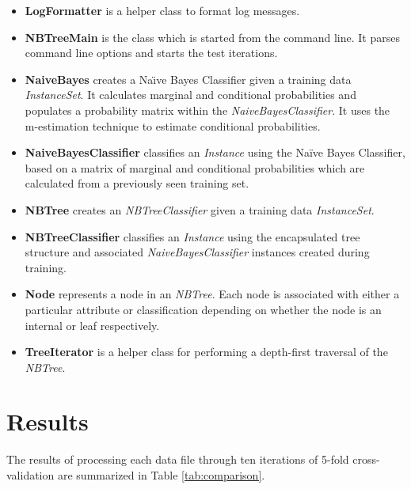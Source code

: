 \documentclass[10pt]{report}
\begin{document}
\begin{itemize}
\item \textbf{LogFormatter} is a helper class to format log messages.

\item \textbf{NBTreeMain} is the class which is started from the command
  line. It parses command line options and starts the test iterations.

\item \textbf{NaiveBayes} creates a Na\"{\i}ve Bayes Classifier
  given a training data \textit{InstanceSet}. It calculates marginal
  and conditional probabilities and populates a probability matrix
  within the \textit{NaiveBayesClassifier}. It uses the m-estimation
  technique to estimate conditional probabilities.

\item \textbf{NaiveBayesClassifier} classifies an \textit{Instance}
  using the Na\"{i}ve Bayes Classifier, based on a matrix of
  marginal and conditional probabilities which are calculated from a
  previously seen training set.

\item \textbf{NBTree} creates an \textit{NBTreeClassifier} given a
  training data \textit{InstanceSet}.

\item \textbf{NBTreeClassifier} classifies an \textit{Instance}
  using the encapsulated tree structure and associated
  \textit{NaiveBayesClassifier} instances created during training.

\item \textbf{Node} represents a node in an \textit{NBTree}. Each node is
  associated with either a particular attribute or classification
  depending on whether the node is an internal or leaf
  respectively. 

\item \textbf{TreeIterator} is a helper class for performing a
  depth-first traversal of the \textit{NBTree}.

\end{itemize}


\section{Results}
\label{sec:results}
The results of processing each data file through ten iterations of
5-fold cross-validation are summarized in Table \ref{tab:comparison}.
\end{document}
